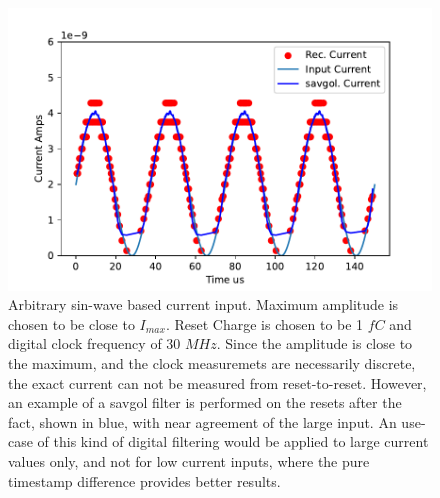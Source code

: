 \begin{figure}[]
\centering
\includegraphics[width=\textwidth]{images/savgol.pdf}
\caption{Arbitrary sin-wave based current input. Maximum amplitude is chosen to be close to $I_{max}$. Reset Charge is chosen to be 1 $\unit{fC}$ and digital clock frequency of 30 $\unit{MHz}$. Since the amplitude is close to the maximum, and the clock measuremets are necessarily discrete, the exact current can not be measured from reset-to-reset. However, an example of a savgol filter is performed on the resets after the fact, shown in blue, with near agreement of the large input. An use-case of this kind of digital filtering would be applied to large current values only, and not for low current inputs, where the pure timestamp difference provides better results.}
\end{figure}~\label{fig:savgol}

